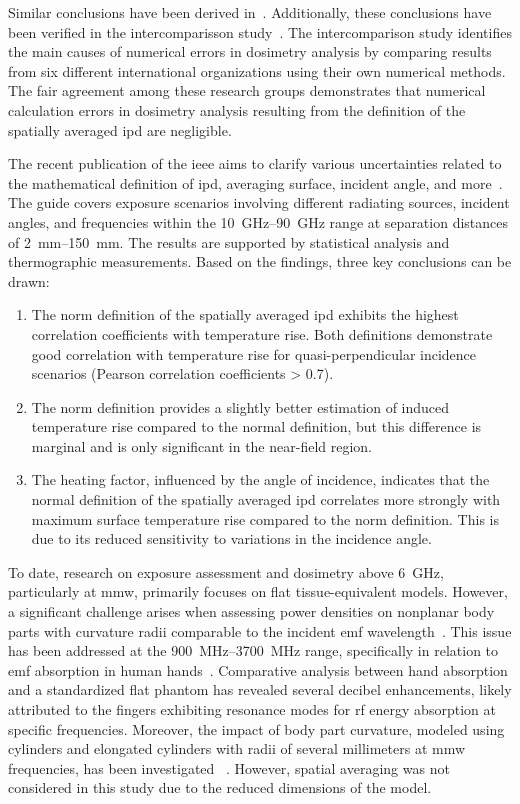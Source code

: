 Similar conclusions have been derived in~\cite{DeSantis2022On}.
Additionally, these conclusions have been verified in the intercomparisson study~\cite{Li2021Intercomparison}.
The intercomparison study identifies the main causes of numerical errors in dosimetry analysis by comparing results from six different international organizations using their own numerical methods.
The fair agreement among these research groups demonstrates that numerical calculation errors in dosimetry analysis resulting from the definition of the spatially averaged \gls{ipd} are negligible.

The recent publication of the \gls{ieee} aims to clarify various uncertainties related to the mathematical definition of \gls{ipd}, averaging surface, incident angle, and more~\cite{IEEE2021Guide}.
The guide covers exposure scenarios involving different radiating sources, incident angles, and frequencies within the \SIrange{10}{90}{\GHz} range at separation distances of \SIrange{2}{150}{\mm}.
The results are supported by statistical analysis and thermographic measurements.
Based on the findings, three key conclusions can be drawn:
\begin{enumerate}
    \item The norm definition of the spatially averaged \gls{ipd} exhibits the highest correlation coefficients with temperature rise. Both definitions demonstrate good correlation with temperature rise for quasi-perpendicular incidence scenarios (Pearson correlation coefficients > \num{0.7}).
    \item The norm definition provides a slightly better estimation of induced temperature rise compared to the normal definition, but this difference is marginal and is only significant in the near-field region.
    \item The heating factor, influenced by the angle of incidence, indicates that the normal definition of the spatially averaged \gls{ipd} correlates more strongly with maximum surface temperature rise compared to the norm definition. This is due to its reduced sensitivity to variations in the incidence angle.
\end{enumerate}

To date, research on exposure assessment and dosimetry above \SI{6}{\GHz}, particularly at \gls{mmw}, primarily focuses on flat tissue-equivalent models.
However, a significant challenge arises when assessing power densities on nonplanar body parts with curvature radii comparable to the incident \gls{emf} wavelength~\cite{Sacco2022Exposure}.
This issue has been addressed at the \SIrange{900}{3700}{\MHz} range, specifically in relation to \gls{emf} absorption in human hands~\cite{Li2012Mechanisms}.
Comparative analysis between hand absorption and a standardized flat phantom has revealed several decibel enhancements, likely attributed to the fingers exhibiting resonance modes for \gls{rf} energy absorption at specific frequencies.
Moreover, the impact of body part curvature, modeled using cylinders and elongated cylinders with radii of several millimeters at \gls{mmw} frequencies, has been investigated ~\cite{Sacco2022Exposure}.
However, spatial averaging was not considered in this study due to the reduced dimensions of the model.

